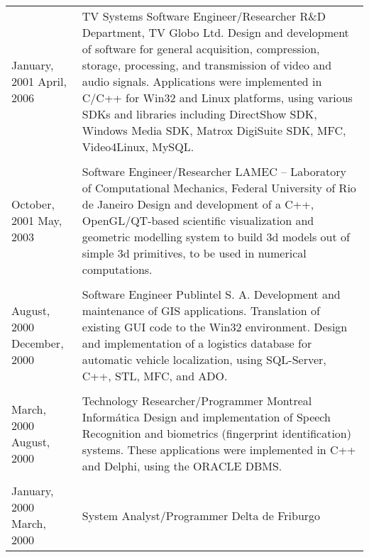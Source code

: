 \begin{longtable}{p{} p{}}

January, 2001 \newline April, 2006 & TV Systems Software Engineer/Researcher \newline
R\&D Department, TV Globo Ltd. \newline
Design and development of software for general acquisition,
compression, storage, processing, and transmission of
video and audio signals. Applications were implemented in C/C++ for Win32 and
Linux platforms, using various SDKs and libraries
including DirectShow SDK, Windows Media SDK, Matrox
DigiSuite SDK, MFC, Video4Linux, MySQL.\\
\\
October, 2001 \newline May, 2003 & Software Engineer/Researcher\newline
LAMEC -- Laboratory of Computational Mechanics,\newline
Federal University of Rio de Janeiro \newline
Design and development of a C++, OpenGL/QT-based scientific
visualization and geometric modelling system to build 3d 
models out of simple 3d primitives, to be used in numerical computations.\\
\\
August, 2000 \newline December, 2000 & Software Engineer\newline
Publintel S. A.\newline
Development and maintenance of GIS applications. Translation
of existing GUI code to the Win32 environment. Design and
implementation of a logistics database for automatic vehicle 
localization, using SQL-Server, C++, STL, MFC, and ADO.\\
\\
March, 2000 \newline August, 2000 & Technology Researcher/Programmer\newline
Montreal Inform\'atica\newline
Design and implementation of Speech Recognition and
biometrics (fingerprint identification) systems. These 
applications were implemented in C++ and Delphi, using 
the ORACLE DBMS.\\
\\
January, 2000 \newline March, 2000 & System Analyst/Programmer\newline
Delta de Friburgo\newline

\end{longtable}
